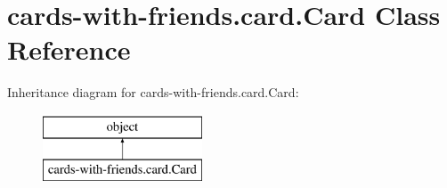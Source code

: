 \hypertarget{classcards-with-friends_1_1card_1_1_card}{\section{cards-\/with-\/friends.card.\-Card Class Reference}
\label{classcards-with-friends_1_1card_1_1_card}
}
Inheritance diagram for cards-\/with-\/friends.card.\-Card\-:\begin{figure}[H]
\begin{center}
\leavevmode
\includegraphics[height=2.000000cm]{classcards-with-friends_1_1card_1_1_card}
\end{center}
\end{figure}
